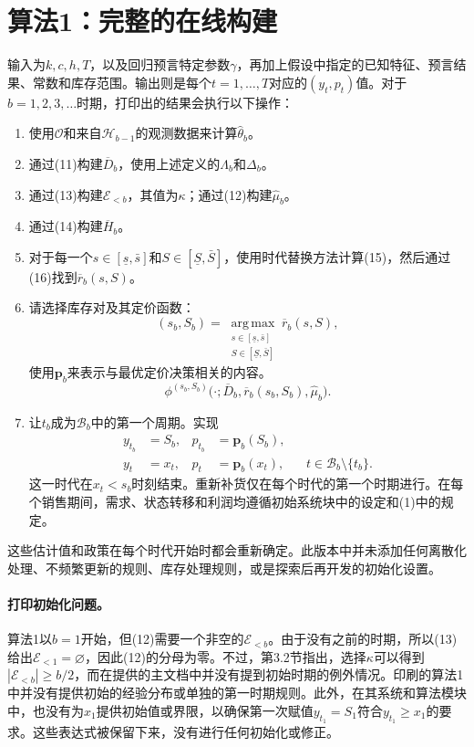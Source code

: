 \documentclass[11pt]{article}
\begin{document}
\section*{算法1：完整的在线构建}
输入为\(k,c,h,T\)，以及回归预言特定参数\(\gamma\)，再加上假设中指定的已知特征、预言结果、常数和库存范围。输出则是每个\(t=1,\ldots,T\)对应的\((y_t,p_t)\)值。对于\(b=1,2,3,\ldots\)时期，打印出的结果会执行以下操作：
\begin{enumerate}
\item 使用\(\mathcal O\)和来自\(\mathcal H_{b-1}\)的观测数据来计算\(\widehat\theta_b\)。
\item 通过(11)构建\(\overline D_b\)，使用上述定义的\(\Lambda_b\)和\(\Delta_b\)。
\item 通过(13)构建\(\mathcal E_{<b}\)，其值为\(\kappa\)；通过(12)构建\(\widehat\mu_b\)。
\item 通过(14)构建\(\overline H_b\)。
\item 对于每一个\(s\in[\underline s,\bar s]\)和\(S\in[\underline S,\bar S]\)，使用时代替换方法计算(15)，然后通过(16)找到\(\overline r_b(s,S)\)。
\item 请选择库存对及其定价函数：
\[
(s_b,S_b)=
\operatorname*{arg\,max}_{\substack{s\in[\underline s,\bar s]\\S\in[\underline S,\bar S]}}
\overline r_b(s,S),
\]
使用\(\boldsymbol p_b\)来表示与最优定价决策相关的内容。
\[
\phi^{(s_b,S_b)}
\bigl(\cdot;\overline D_b,\overline r_b(s_b,S_b),\widehat\mu_b\bigr).
\]
\item 让\(t_b\)成为\(\mathcal B_b\)中的第一个周期。实现
\[
\begin{aligned}
y_{t_b}&=S_b,&p_{t_b}&=\boldsymbol p_b(S_b),\\
y_t&=x_t,&p_t&=\boldsymbol p_b(x_t),
&&t\in\mathcal B_b\setminus\{t_b\}.
\end{aligned}
\]
这一时代在\(x_t<s_b\)时刻结束。重新补货仅在每个时代的第一个时期进行。在每个销售期间，需求、状态转移和利润均遵循初始系统块中的设定和(1)中的规定。
\end{enumerate}
这些估计值和政策在每个时代开始时都会重新确定。此版本中并未添加任何离散化处理、不频繁更新的规则、库存处理规则，或是探索后再开发的初始化设置。

\paragraph{打印初始化问题。}
算法1以\(b=1\)开始，但(12)需要一个非空的\(\mathcal E_{<b}\)。由于没有之前的时期，所以(13)给出\(\mathcal E_{<1}=\varnothing\)，因此(12)的分母为零。不过，第3.2节指出，选择\(\kappa\)可以得到\(|\mathcal E_{<b}|\geq b/2\)，而在提供的主文档中并没有提到初始时期的例外情况。印刷的算法1中并没有提供初始的经验分布或单独的第一时期规则。此外，在其系统和算法模块中，也没有为\(x_1\)提供初始值或界限，以确保第一次赋值\(y_{t_1}=S_1\)符合\(y_{t_1}\geq x_1\)的要求。这些表达式被保留下来，没有进行任何初始化或修正。
\end{document}

